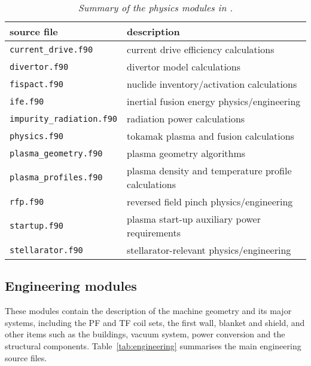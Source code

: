 \begin{table}[tbph]
\begin{center}

\begin{tabular}{||l||l||} \hline
source file   & description \\ \hline
\texttt{current\_drive.f90} & current drive efficiency calculations \\
\texttt{divertor.f90} & divertor model calculations\\
\texttt{fispact.f90} & nuclide inventory/activation calculations \\
\texttt{ife.f90} & inertial fusion energy physics/engineering \\
\texttt{impurity\_radiation.f90} & radiation power calculations \\
\texttt{physics.f90} & tokamak plasma and fusion calculations \\
\texttt{plasma\_geometry.f90} & plasma geometry algorithms \\
\texttt{plasma\_profiles.f90} & plasma density and temperature profile calculations \\
\texttt{rfp.f90} & reversed field pinch physics/engineering \\
\texttt{startup.f90} & plasma start-up auxiliary power requirements \\
\texttt{stellarator.f90 } & stellarator-relevant physics/engineering \\
\hline
\end{tabular}
\end{center}
\caption[Summary of physics modules]
{\label{tab:physics}
  \textit{Summary of the physics modules in \process.}
}
\end{table}

\subsection{Engineering modules}

These modules contain the description of the machine geometry and its major
systems, including the PF and TF coil sets, the first wall, blanket and
shield, and other items such as the buildings, vacuum system, power conversion
and the structural components.  Table~\ref{tab:engineering} summarises the main
engineering source files.

